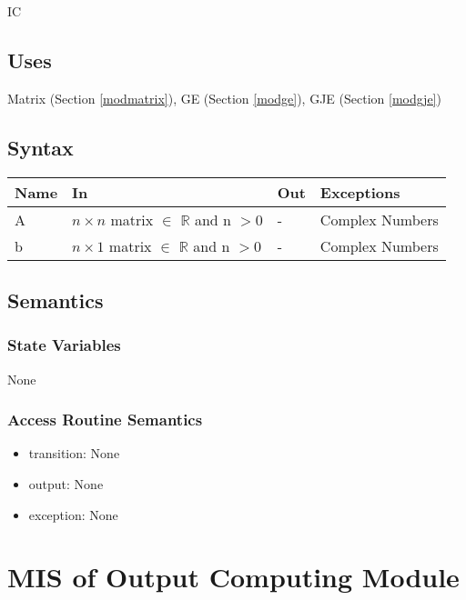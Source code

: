 \documentclass[12pt, titlepage]{article}
\begin{document}
IC


\subsection{Uses}
Matrix (Section \ref{modmatrix}), GE (Section \ref{modge}), GJE (Section \ref{modgje}) 


\subsection{Syntax}

\begin{center}
\begin{tabular}{p{2cm} p{4cm} p{4cm} p{2cm}}
\hline
\textbf{Name} & \textbf{In} & \textbf{Out} & \textbf{Exceptions} \\
\hline
A & $n \times n$ matrix $\in$ $\mathbb{R}$ and n $> 0$ & - & Complex Numbers \\
b & $n \times 1$ matrix $\in$ $\mathbb{R}$ and n $> 0$ & - & Complex Numbers \\
\hline
\end{tabular}
\end{center}

\subsection{Semantics}

\subsubsection{State Variables}

None


\subsubsection{Access Routine Semantics}

\noindent %
\begin{itemize}
\item transition: None %
\item output: None %
\item exception: None %
\end{itemize}

\newpage


\section{MIS of {Output Computing Module}} \label{modoc} %
\end{document}
